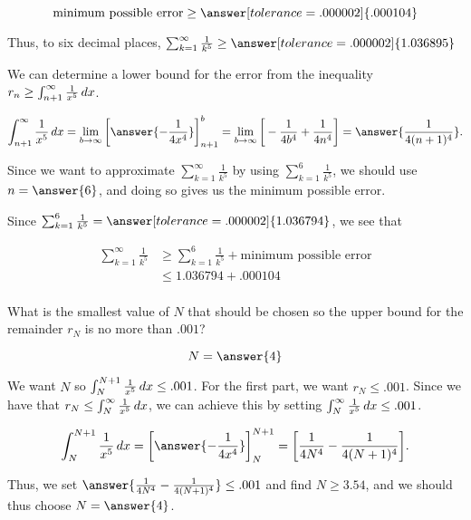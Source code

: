 \documentclass{ximera}
\begin{document}
\begin{exercise}
\begin{exercise}
\[
\textrm{minimum possible error} \geq \answer[tolerance=.000002]{.000104}
\]

Thus, to six decimal places, $\sum_{k=1}^{\infty} \frac{1}{k^5} \geq \answer[tolerance=.000002]{ 1.036895}$

\begin{hint}
We can determine a lower bound for the error from the inequality $ r_n \geq \int_{n+1}^{\infty} \frac{1}{x^5} \mathop{}\!d x$. 

\[
\int_{n+1}^\infty \frac{1}{x^5} \d x = \lim_{b \to \infty} \eval{\answer{-\frac{1}{4x^4}}}_{n+1}^b = \lim_{b \to \infty} \eval{-\frac{1}{4b^4}+\frac{1}{4n^4}} =\answer{\frac{1}{4(n+1)^4}}. 
\]

Since we want to approximate $\sum_{k=1}^{\infty} \frac{1}{k^5}$ by using $\sum_{k=1}^{6} \frac{1}{k^5}$, we should use $n=\answer{6}$, and doing so gives us the minimum possible error.

Since $\sum_{k=1}^{6} \frac{1}{k^5} = \answer[tolerance=.000002]{1.036794}$, we see that 

\begin{align*}
\sum_{k=1}^{\infty} \frac{1}{k^5} & \geq \sum_{k=1}^{6} \frac{1}{k^5} + \textrm{minimum possible error} \\
& \leq 1.036794 + .000104 \\
\end{align*}

\end{hint}
\end{exercise}


\begin{exercise}
What is the smallest value of $N$ that should be chosen so the upper bound for the remainder $r_N$ is no more than $.001$?

\[
N=\answer{4}
\]

\begin{hint}
We want $N$ so $\int_N^{N+1} \frac{1}{x^5} \mathop{}\!d x \leq .001$.  For the first part, we want $r_N \leq .001$.  Since we have that $r_N \leq \int_{N}^{\infty} \frac{1}{x^5} \mathop{}\!d x$, we can achieve this by setting $\int_{N}^{\infty} \frac{1}{x^5} \mathop{}\!d x \leq .001$. 

\[
\int_N^{N+1} \frac{1}{x^5} \d x = \eval{\answer{-\frac{1}{4x^4}}}_N^{N+1} = \eval{\frac{1}{4N^4}-\frac{1}{4(N+1)^4}}.
\]


Thus, we set $\answer{\frac{1}{4N^4}-\frac{1}{4(N+1)^4}} \leq .001$ and find $N \geq 3.54$, and we should thus choose $N = \answer{4}$.
\end{hint}
\end{exercise}

\end{exercise}
\end{document}
